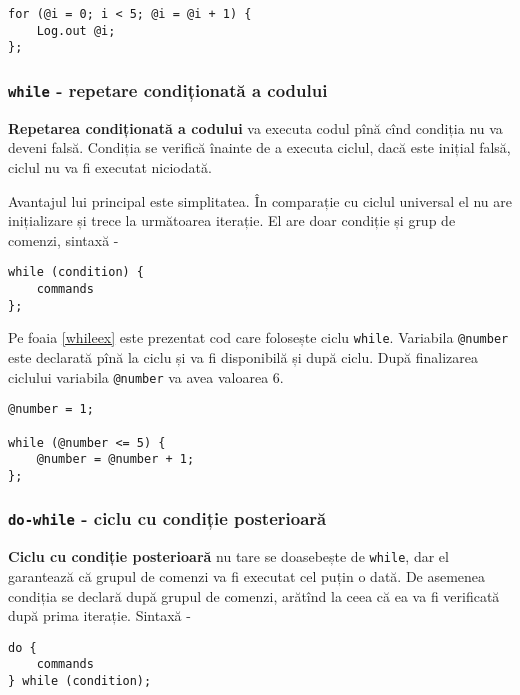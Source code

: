 \begin{sourcecode}
\label{uniloopex}
\begin{verbatim}
for (@i = 0; i < 5; @i = @i + 1) {
	Log.out @i;
};
\end{verbatim}
\end{sourcecode}

\subsubsection{\texttt{while} - repetare condiționată a codului}

{\bf Repetarea condiționată a codului} va executa codul pînă cînd condiția nu va deveni falsă. Condiția se verifică înainte de a executa ciclul, dacă este inițial falsă, ciclul nu va fi executat niciodată.

Avantajul lui principal este simplitatea. În comparație cu ciclul universal el nu are inițializare și trece la următoarea iterație. El are doar condiție și grup de comenzi, sintaxă -
\begin{verbatim}
while (condition) {
	commands
};
\end{verbatim}

Pe foaia \ref{whileex} este prezentat cod care folosește ciclu \texttt{while}. Variabila \texttt{@number} este declarată pînă la ciclu și va fi disponibilă și după ciclu. După finalizarea ciclului variabila \texttt{@number} va avea valoarea 6.

\begin{sourcecode}
\label{whileex}
\begin{verbatim}
@number = 1;

while (@number <= 5) {
	@number = @number + 1;
};
\end{verbatim}
\end{sourcecode}

\subsubsection{\texttt{do-while} - ciclu cu condiție posterioară}

{\bf Ciclu cu condiție posterioară} nu tare se doasebește de \texttt{while}, dar el garantează că grupul de comenzi va fi executat cel puțin o dată. De asemenea condiția se declară după grupul de comenzi, arătînd la ceea că ea va fi verificată după prima iterație. Sintaxă -
\begin{verbatim}
do {
	commands
} while (condition);
\end{verbatim}

